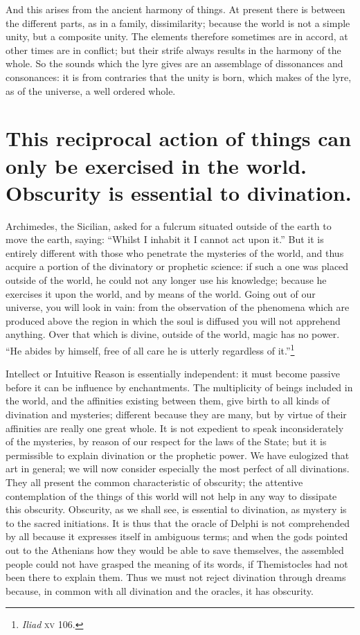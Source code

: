 \documentclass[12pt]{article}
\begin{document}
And this arises from the ancient harmony of things. At present there is between
the different parts, as in a family, dissimilarity; because the world is not a
simple unity, but a composite unity. The elements therefore sometimes are in
accord, at other times are in conflict; but their strife always results in the
harmony of the whole. So the sounds which the lyre gives are an assemblage of
dissonances and consonances: it is from contraries that the unity is born,
which makes of the lyre, as of the universe, a well ordered whole.


\section{This reciprocal action of things can only be exercised in the world.
Obscurity is essential to divination.}

Archimedes, the Sicilian, asked for a fulcrum situated outside of the earth to
move the earth, saying: ``Whilst I inhabit it I cannot act upon it.'' But it is
entirely different with those who penetrate the mysteries of the world, and
thus acquire a portion of the divinatory or prophetic science: if such a one
was placed outside of the world, he could not any longer use his knowledge;
because he exercises it upon the world, and by means of the world. Going out of
our universe, you will look in vain: from the observation of the phenomena
which are produced above the region in which the soul is diffused you will not
apprehend anything. Over that which is divine, outside of the world, magic has
no power. ``He abides by himself, free of all care he is utterly regardless of
it.''\footnote{\textit{Iliad} \textsc{xv} 106.}

Intellect or Intuitive Reason is essentially independent: it must become
passive before it can be influence by enchantments. The multiplicity of beings
included in the world, and the affinities existing between them, give birth to
all kinds of divination and mysteries; different because they are many, but by
virtue of their affinities are really one great whole. It is not expedient to
speak inconsiderately of the mysteries, by reason of our respect for the laws
of the State; but it is permissible to explain divination or the prophetic
power. We have eulogized that art in general; we will now consider especially
the most perfect of all divinations. They all present the common characteristic
of obscurity; the attentive contemplation of the things of this world will not
help in any way to dissipate this obscurity. Obscurity, as we shall see, is
essential to divination, as mystery is to the sacred initiations. It is thus
that the oracle of Delphi is not comprehended by all because it expresses
itself in ambiguous terms; and when the gods pointed out to the Athenians how
they would be able to save themselves, the assembled people could not have
grasped the meaning of its words, if Themistocles had not been there to explain
them. Thus we must not reject divination through dreams because, in common with
all divination and the oracles, it has obscurity.
\end{document}
